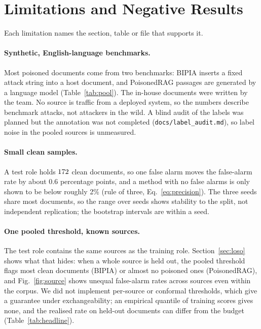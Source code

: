 \section{Limitations and Negative Results}
\label{sec:limitations}

Each limitation names the section, table or file that supports it.

\paragraph{Synthetic, English-language benchmarks.}
Most poisoned documents come from two benchmarks: BIPIA inserts a fixed attack
string into a host document, and PoisonedRAG passages are generated by a language
model (Table~\ref{tab:pool}). The in-house documents were written by the team. No
source is traffic from a deployed system, so the numbers describe benchmark
attacks, not attackers in the wild. A blind audit of the labels was planned but
the annotation was not completed (\texttt{docs/label\_audit.md}), so label noise
in the pooled sources is unmeasured.

\paragraph{Small clean samples.}
A test role holds $172$ clean documents, so one false alarm moves the
false-alarm rate by about 0.6 percentage points, and a method with no false alarms
is only shown to be below roughly 2\% (rule of three, Eq.~\ref{eq:precision}).
The three seeds share most documents, so the range over seeds shows stability to
the split, not independent replication; the bootstrap intervals are within a seed.

\paragraph{One pooled threshold, known sources.}
The test role contains the same sources as the training role. Section~\ref{sec:loso}
shows what that hides: when a whole source is held out, the pooled threshold
flags most clean documents (BIPIA) or almost no poisoned ones (PoisonedRAG), and
Fig.~\ref{fig:source} shows unequal false-alarm rates across sources even within
the corpus. We did not implement per-source or conformal thresholds, which give a
guarantee under exchangeability; an empirical quantile of training scores gives
none, and the realised rate on held-out documents can differ from the budget
(Table~\ref{tab:headline}).

